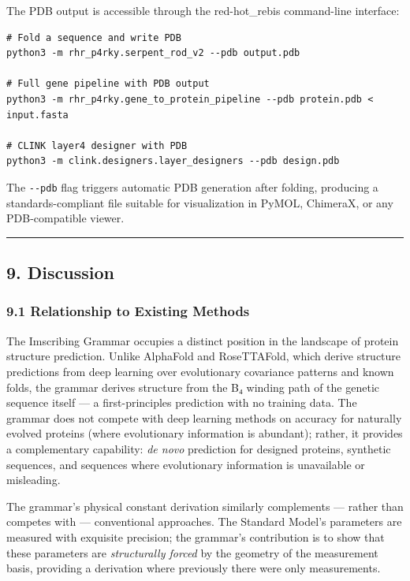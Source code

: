 The PDB output is accessible through the red-hot\_rebis command-line
interface:

\begin{verbatim}
# Fold a sequence and write PDB
python3 -m rhr_p4rky.serpent_rod_v2 --pdb output.pdb

# Full gene pipeline with PDB output
python3 -m rhr_p4rky.gene_to_protein_pipeline --pdb protein.pdb < input.fasta

# CLINK layer4 designer with PDB
python3 -m clink.designers.layer_designers --pdb design.pdb
\end{verbatim}

The \texttt{-\/-pdb} flag triggers automatic PDB generation after
folding, producing a standards-compliant file suitable for visualization
in PyMOL, ChimeraX, or any PDB-compatible viewer.

\begin{center}\rule{0.5\linewidth}{0.5pt}\end{center}

\hypertarget{discussion}{%
\subsection{9. Discussion}\label{discussion}}

\hypertarget{relationship-to-existing-methods}{%
\subsubsection{9.1 Relationship to Existing
Methods}\label{relationship-to-existing-methods}}

The Imscribing Grammar occupies a distinct position in the landscape of
protein structure prediction. Unlike AlphaFold and RoseTTAFold, which
derive structure predictions from deep learning over evolutionary
covariance patterns and known folds, the grammar derives structure from
the B₄ winding path of the genetic sequence itself --- a
first-principles prediction with no training data. The grammar does not
compete with deep learning methods on accuracy for naturally evolved
proteins (where evolutionary information is abundant); rather, it
provides a complementary capability: \emph{de novo} prediction for
designed proteins, synthetic sequences, and sequences where evolutionary
information is unavailable or misleading.

The grammar's physical constant derivation similarly complements ---
rather than competes with --- conventional approaches. The Standard
Model's parameters are measured with exquisite precision; the grammar's
contribution is to show that these parameters are \emph{structurally
forced} by the geometry of the measurement basis, providing a derivation
where previously there were only measurements.

